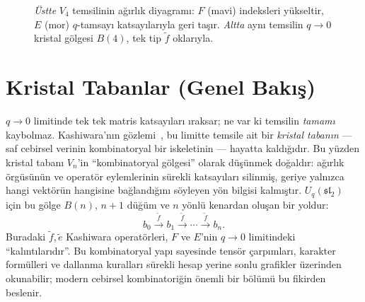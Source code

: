 \documentclass[12pt,a4paper,fleqn]{report}
\newcommand{\normalsemi}{;}
\newcommand{\normalsemi}{\begingroup\semicolonfont;\endgroup}
\numberwithin{equation}{chapter}
\theoremstyle{plain}
\theoremstyle{definition}
\renewcommand{\sl}{\mathfrak{sl}}
\newcommand{\Uq}{U_q(\sl_2)}
\newcommand{\qint}[1]{[#1]_q}
\begin{document}
\begin{figure}[h]
\centering
{}
\caption{\emph{Üstte} $V_4$ temsilinin ağırlık diyagramı: $F$ (mavi) indeksleri
yükseltir, $E$ (mor) $q$-tamsayı katsayılarıyla geri taşır. \emph{Altta} aynı
temsilin $q\to 0$ kristal gölgesi $B(4)$, tek tip $\tilde f$ oklarıyla.}
\label{fig:weight}
\end{figure}

\chapter{Kristal Tabanlar (Genel Bakış)}

$q \to 0$ limitinde tek tek matris katsayıları ıraksar\normalsemi{} ne var ki temsilin
\emph{tamamı} kaybolmaz. Kashiwara'nın gözlemi~\cite{Kashiwara,HK}, bu limitte temsile ait bir
\emph{kristal tabanın} --- saf cebirsel verinin kombinatoryal bir iskeletinin ---
hayatta kaldığıdır. Bu yüzden kristal tabanı $V_n$'in ``kombinatoryal gölgesi''
olarak düşünmek doğaldır: ağırlık örgüsünün ve operatör eylemlerinin sürekli
katsayıları silinmiş, geriye yalnızca hangi vektörün hangisine bağlandığını
söyleyen yön bilgisi kalmıştır. $\Uq$ için bu gölge $B(n)$, $n+1$ düğüm ve $n$
yönlü kenardan oluşan bir yoldur:
\[
  b_0 \xrightarrow{\tilde{f}} b_1 \xrightarrow{\tilde{f}} \cdots
  \xrightarrow{\tilde{f}} b_n.
\]
Buradaki $\tilde{f}, \tilde{e}$ Kashiwara operatörleri, $F$ ve $E$'nin
$q \to 0$ limitindeki ``kalıntılarıdır''. Bu kombinatoryal yapı sayesinde tensör
çarpımları, karakter formülleri ve dallanma kuralları sürekli hesap yerine
sonlu grafikler üzerinden okunabilir\normalsemi{} modern cebirsel kombinatoriğin önemli bir
bölümü bu fikirden beslenir.
\end{document}
